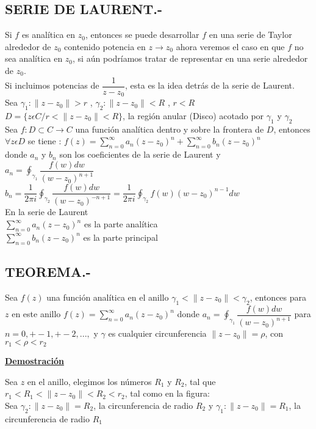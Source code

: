 \documentclass[10pt,a4paper]{article}
\begin{document}
\subsection{SERIE DE LAURENT.-}
Si $f$ es analítica en $z_0$, entonces se puede desarrollar $f$ en una serie de Taylor alrededor de $z_0$ contenido potencia en $\displaystyle{z \rightarrow z_0}$ ahora veremos el caso en que $f$ no sea analítica en $z_0$, si aún podríamos tratar de representar en una serie alrededor de $z_0$. \\
Si incluimos potencias de $\displaystyle{\dfrac{1}{z-z_0}}$, esta es la idea detrás de la serie de Laurent. \\
Sea $\displaystyle{\gamma_1 : \parallel z - z_0 \parallel > r}$ , $\displaystyle{\gamma_2 : \parallel z - z_0 \parallel < R}$ , $r < R$\\
$\displaystyle{D = \lbrace z \epsilon C / r < \parallel    z - z_0 \parallel < R \rbrace}$, la región anular (Disco) acotado por $\gamma_1$ y $\gamma_2$\\
Sea $\displaystyle{f: D \subset C \longrightarrow C}$ una función analítica dentro y sobre la frontera de $D$, entonces $\forall z \epsilon D$ se tiene : $\displaystyle{f(z) = \sum_{n = 0}^{\infty} a_n (z-z_0)^n + \sum_{n = 0}^{\infty} b_n (z-z_0)^n}$\\
donde $a_n$ y $b_n$ son los coeficientes de la serie de Laurent y $\displaystyle{a_n = \oint_{\gamma_1} \dfrac{f(w) dw}{(w-z_0)^{n+1}}}$ 
$\displaystyle{b_n = \dfrac{1}{2 \pi i} \oint_{\gamma_2} \dfrac{f(w) dw}{(w-z_0)^{-n+1}} = \dfrac{1}{2 \pi i} \oint_{\gamma_2} f(w) (w-z_0)^{n-1} dw}$ \\
En la serie de Laurent \\
$\displaystyle{\sum_{n = 0}^{\infty} a_n (z-z_0)^n}$ es la parte analítica \\
$\displaystyle{\sum_{n = 0}^{\infty} b_n (z-z_0)^n}$ es la parte principal \\
\subsection{TEOREMA.-}
Sea $f(z)$ una función analítica en el anillo $\displaystyle{\gamma_1 < \parallel z - z_0 \parallel < \gamma_2}$, entonces para $z$ en este anillo $\displaystyle{f(z) = \sum_{n = 0}^{\infty} a_n (z-z_0)^n}$ donde $\displaystyle{a_n = \oint_{\gamma_1} \dfrac{f(w) dw}{(w-z_0)^{n+1}}}$ para $\displaystyle{n = 0, +- 1, +-2,...,}$ y $\gamma$ es cualquier circunferencia $\parallel  z - z_0 \parallel = \rho$, con $r_1 < \rho < r_2$\\
 \begin{center}
  \textbf{\underline{Demostración}}
  \end{center} 
Sea $z$ en el anillo, elegimos los números $R_1$ y $R_2$, tal que $\displaystyle{r_1 < R_1 <  \parallel z -z_0  \parallel < R_2 < r_2}$, tal como en la figura: \\
Sea $\gamma_2 : \parallel z - z_0 \parallel = R_2$, la circunferencia de radio $R_2$ y $\gamma_1 : \parallel z -z_0 \parallel = R_1$, la circunferencia de radio $R_1$
\end{document}
